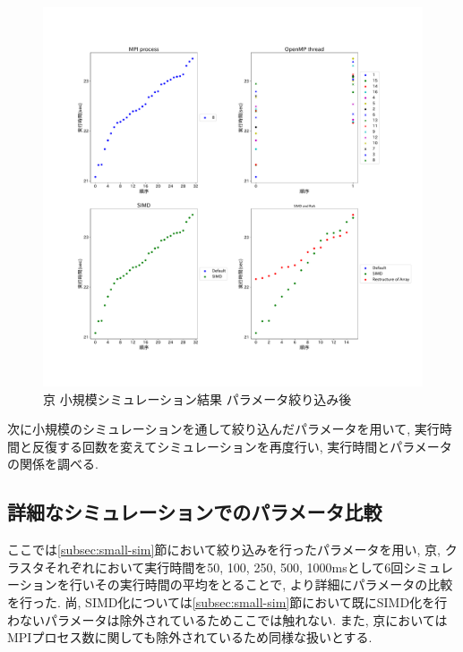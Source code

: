 \begin{figure}[htb]
\begin{center}
    \includegraphics[width=14cm]{./images/k-bench-adjusted-final.pdf}
    \caption{京 小規模シミュレーション結果 パラメータ絞り込み後}
    \label{fig:k-bench-adjusted-final}
\end{center}
\end{figure}
\clearpage
次に小規模のシミュレーションを通して絞り込んだパラメータを用いて,
実行時間と反復する回数を変えてシミュレーションを再度行い,
実行時間とパラメータの関係を調べる.\\

\subsection{詳細なシミュレーションでのパラメータ比較}
\label{subsec:detail-sim}
ここでは\ref{subsec:small-sim}節において絞り込みを行ったパラメータを用い,
京, クラスタそれぞれにおいて実行時間を50, 100, 250, 500, 1000msとして6回シミュレーションを行いその実行時間の平均をとることで,
より詳細にパラメータの比較を行った.
尚, SIMD化については\ref{subsec:small-sim}節において既にSIMD化を行わないパラメータは除外されているためここでは触れない.
また, 京においてはMPIプロセス数に関しても除外されているため同様な扱いとする.\\

